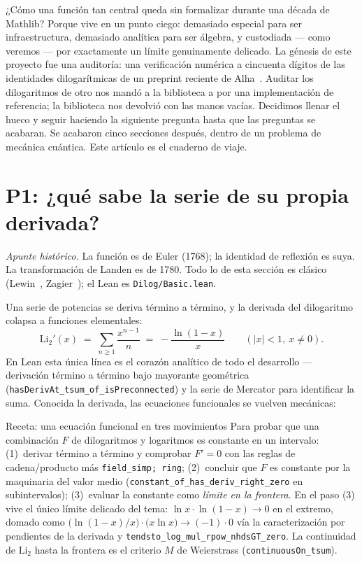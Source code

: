 \documentclass[11pt]{article}
\newcommand{\lean}[1]{\texttt{#1}}
\newcommand{\Li}{\mathrm{Li}_2}
\begin{document}
¿C\'omo una funci\'on tan central queda sin formalizar durante una d\'ecada de Mathlib?
Porque vive en un punto ciego: demasiado especial para ser infraestructura, demasiado
anal\'itica para ser \'algebra, y custodiada --- como veremos --- por exactamente un
l\'imite genuinamente delicado. La g\'enesis de este proyecto fue una auditor\'ia: una
verificaci\'on num\'erica a cincuenta d\'igitos de las identidades dilogar\'itmicas de
un preprint reciente de Alha~\cite{alha}. Auditar los dilogaritmos de otro nos mand\'o a
la biblioteca a por una implementaci\'on de referencia; la biblioteca nos devolvi\'o con
las manos vac\'ias. Decidimos llenar el hueco y seguir haciendo la siguiente pregunta
hasta que las preguntas se acabaran. Se acabaron cinco secciones despu\'es, dentro de un
problema de mec\'anica cu\'antica. Este art\'iculo es el cuaderno de viaje.

\section{P1: ¿qu\'e sabe la serie de su propia derivada?}\label{sec:dilog}

\emph{Apunte hist\'orico.} La funci\'on es de Euler (1768); la identidad de reflexi\'on
es suya. La transformaci\'on de Landen es de 1780. Todo lo de esta secci\'on es
cl\'asico (Lewin~\cite{lewin}, Zagier~\cite{zagier}); el Lean es
\lean{Dilog/Basic.lean}.

Una serie de potencias se deriva t\'ermino a t\'ermino, y la derivada del dilogaritmo
colapsa a funciones elementales:
\[
\Li'(x) \;=\; \sum_{n\ge1}\frac{x^{n-1}}{n} \;=\; -\frac{\ln(1-x)}{x}
\qquad(\lvert x\rvert<1,\ x\ne 0).
\]
En Lean esta \'unica l\'inea es el coraz\'on anal\'itico de todo el desarrollo ---
derivaci\'on t\'ermino a t\'ermino bajo mayorante geom\'etrica
(\lean{hasDerivAt\_tsum\_of\_isPreconnected}) y la serie de Mercator para identificar la
suma. Conocida la derivada, las ecuaciones funcionales se vuelven mec\'anicas:

\begin{recipebox}{Receta: una ecuaci\'on funcional en tres movimientos}
Para probar que una combinaci\'on $F$ de dilogaritmos y logaritmos es constante en un
intervalo: (1)~derivar t\'ermino a t\'ermino y comprobar $F'=0$ con las reglas de
cadena/producto m\'as \lean{field\_simp; ring}; (2)~concluir que $F$ es constante por la
maquinaria del valor medio (\lean{constant\_of\_has\_deriv\_right\_zero} en
subintervalos); (3)~evaluar la constante como \emph{l\'imite en la frontera}. En el paso
(3) vive el \'unico l\'imite delicado del tema: $\ln x\cdot\ln(1-x)\to 0$ en el extremo,
domado como $\big(\ln(1-x)/x\big)\cdot\big(x\ln x\big)\to(-1)\cdot 0$ v\'ia la
caracterizaci\'on por pendientes de la derivada y
\lean{tendsto\_log\_mul\_rpow\_nhdsGT\_zero}. La continuidad de $\Li$ hasta la frontera
es el criterio $M$ de Weierstrass (\lean{continuousOn\_tsum}).
\end{recipebox}
\end{document}
